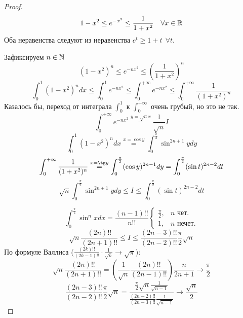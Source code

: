 \begin{proof}
    $$1-x^2\leq e^{-x^2}\leq \frac{1}{1+x^2} \quad \forall x\in\mathbb{R}$$
    Оба неравенства следуют из неравенства $e^t \geq 1+t \ \ \forall t$.

    Зафиксируем $n\in\mathbb{N}$
    $$(1-x^2)^n\leq e^{-nx^2}\leq \left(\frac{1}{1+x^2}\right)^{n}$$
    $$\int_0^1 (1-x^2)^n dx \leq \int_0^1 e^{-nx^2} \leq \int_0^{+\infty} e^{-nx^2} \leq \int_0^{+\infty} \frac{1}{(1+x^2)^{n}}$$
    Казалось бы, переход от интеграла $\int_0^1$ к $\int_0^{+\infty}$ очень грубый, но это не так.
    $$\int_0^{+\infty} e^{-nx^2}\stackrel{y=\sqrt n x}{=}\frac{1}{\sqrt n} I$$
    $$\int_0^1 (1-x^2)^n dx\stackrel{x=\cos y}{=} \int_0^{\frac{\pi}{2}} \sin^{2n+1}ydy$$
    $$\int_0^{+\infty} \frac{1}{(1+x^2)^{n}}\stackrel{x=\tg y}{=}\int_0^{\frac{\pi}{2}} (\cos y)^{2n-1} dy = \int_0^{\frac{\pi}{2}} (\sin t)^{2n-2} dt$$
    $$\sqrt n \int_0^{\frac{\pi}{2}} \sin^{2n+1}ydy \leq I \leq \int_0^{\frac{\pi}{2}} (\sin t)^{2n-2} dt$$

    $$\int_0^{\frac{\pi}{2}} \sin^n x dx = \frac{(n-1)!!}{n!!}\begin{cases}
        \frac{\pi}{2} , & n \text{ чет.} \\
        1 , & n \text{ нечет.}
    \end{cases}$$
    $$\sqrt n \frac{(2n)!!}{(2n+1)!!} \leq I \leq \frac{(2n-3)!!}{(2n-2)!!}\frac{\pi}{2}\sqrt n$$
    По формуле Валлиса ($\frac{(2k)!!}{(2k-1)!!}\cdot\frac{1}{\sqrt k}\to\sqrt \pi$):
    $$\sqrt n \frac{(2n)!!}{(2n+1)!!}=\left(\frac{1}{\sqrt n}\frac{(2n)!!}{(2n-1)!!}\right)\frac{n}{2n+1}\to\frac{\pi}{2}$$
    $$\frac{(2n-3)!!}{(2n-2)!!}\frac{\pi}{2}\sqrt n = \frac{\frac{\pi}{2}\sqrt n\frac{1}{\sqrt {n-1}}}{\frac{(2n-2)!!}{(2n-3)!!}\frac{1}{\sqrt {n-1}}}\to \frac{\sqrt n}{2}$$
\end{proof}


